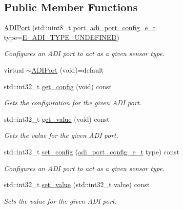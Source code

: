 \subsection*{Public Member Functions}
\begin{DoxyCompactItemize}
\item 
\hyperlink{classpros_1_1ADIPort_ab6ef7710de366895859d770ffb1d8cf1}{A\+D\+I\+Port} (std\+::uint8\+\_\+t port, \hyperlink{adi_8h_a4efff81399e823764aa05cd5c172ea55}{adi\+\_\+port\+\_\+config\+\_\+e\+\_\+t} type=\hyperlink{adi_8h_ad5f9ddf0fd9de73c4b23fa5485144b7fa37e9d6ebc03d88c58db1904a7f2b7373}{E\+\_\+\+A\+D\+I\+\_\+\+T\+Y\+P\+E\+\_\+\+U\+N\+D\+E\+F\+I\+N\+ED})
\begin{DoxyCompactList}\small\item\em Configures an A\+DI port to act as a given sensor type. \end{DoxyCompactList}\item 
virtual \hyperlink{classpros_1_1ADIPort_ae6a3753c05e008992e6eff5e8c927e46}{$\sim$\+A\+D\+I\+Port} (void)=default
\item 
std\+::int32\+\_\+t \hyperlink{classpros_1_1ADIPort_a1227bc815b12d2789cb78f6d3dcaf37b}{get\+\_\+config} (void) const
\begin{DoxyCompactList}\small\item\em Gets the configuration for the given A\+DI port. \end{DoxyCompactList}\item 
std\+::int32\+\_\+t \hyperlink{classpros_1_1ADIPort_ac79b5fd3ce67ae6ffc4b1fbbb306e997}{get\+\_\+value} (void) const
\begin{DoxyCompactList}\small\item\em Gets the value for the given A\+DI port. \end{DoxyCompactList}\item 
std\+::int32\+\_\+t \hyperlink{classpros_1_1ADIPort_abd86653eebbc34b863ace81839f7e40c}{set\+\_\+config} (\hyperlink{adi_8h_a4efff81399e823764aa05cd5c172ea55}{adi\+\_\+port\+\_\+config\+\_\+e\+\_\+t} type) const
\begin{DoxyCompactList}\small\item\em Configures an A\+DI port to act as a given sensor type. \end{DoxyCompactList}\item 
std\+::int32\+\_\+t \hyperlink{classpros_1_1ADIPort_ae6711117fbceb3bb6e3602c4ef63aff1}{set\+\_\+value} (std\+::int32\+\_\+t value) const
\begin{DoxyCompactList}\small\item\em Sets the value for the given A\+DI port. \end{DoxyCompactList}\end{DoxyCompactItemize}

